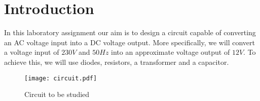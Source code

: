 \section{Introduction}
\label{sec:introduction}

In this laboratory assignment our aim is to design a 
circuit capable of converting an AC voltage input into a 
DC voltage output. More specifically, we will convert a voltage
 input of $230 V$ and $50 Hz$ into an approximate voltage
  output of $12 V$. To achieve this, we will use diodes,
   resistors, a transformer and a capacitor.

\begin{figure}[H] \centering
\texttt{[image: circuit.pdf]}
\caption{Circuit to be studied}
\label{fig:circuit}
\end{figure}

